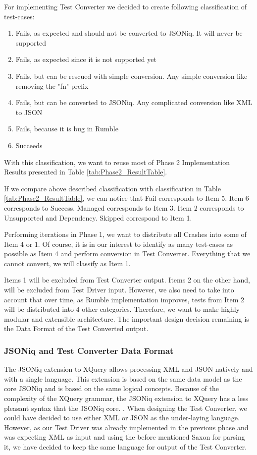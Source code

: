 For implementing Test Converter we decided to create following classification of test-cases:
\begin{enumerate}
	\item Fails, as expected and should not be converted to JSONiq. It will never be supported
	\item Fails, as expected since it is not supported yet
	\item Fails, but can be rescued with simple conversion. Any simple conversion like removing the "fn" prefix 
	\item Fails, but can be converted to JSONiq. Any complicated conversion like XML to JSON
	\item Fails, because it is bug in Rumble
	\item Succeeds
\end{enumerate}

With this classification, we want to reuse most of Phase 2 Implementation Results presented in Table \ref{tab:Phase2_ResultTable}.

If we compare above described classification with classification in Table \ref{tab:Phase2_ResultTable}, we can notice that Fail corresponds to Item 5. Item 6 corresponds to Success. Managed corresponds to Item 3. Item 2 corresponds to Unsupported and Dependency. Skipped correspond to Item 1. 

Performing iterations in Phase 1, we want to distribute all Crashes into some of Item 4 or 1. Of course, it is in our interest to identify as many test-cases as possible as Item 4 and perform conversion in Test Converter. Everything that we cannot convert, we will classify as Item 1. 

Items 1 will be excluded from Test Converter output. Items 2 on the other hand, will be excluded from Test Driver input. However, we also need to take into account that over time, as Rumble implementation improves, tests from Item 2 will be distributed into 4 other categories. Therefore, we want to make highly modular and extensible architecture. The important design decision remaining is the Data Format of the Test Converted output.

\subsubsection{JSONiq and Test Converter Data Format}
The JSONiq extension to XQuery allows processing XML and JSON natively and with a single language. This extension is based on the same data model as the core JSONiq and is based on the same logical concepts. Because of the complexity of the XQuery grammar, the JSONiq extension to XQuery has a less pleasant syntax that the JSONiq core. . When designing the Test Converter, we could have decided to use either XML or JSON as the under-laying language. However, as our Test Driver was already implemented in the previous phase and was expecting XML as input and using the before mentioned Saxon for parsing it, we have decided to keep the same language for output of the Test Converter. 

